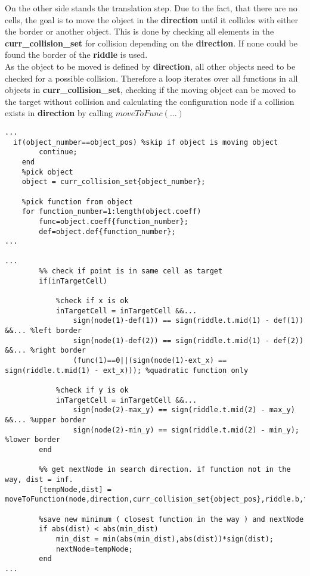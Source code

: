 On the other side stands the translation step. Due to the fact, that there are no cells, the goal is to move the object in the \textbf{direction} until it collides with either the border or another object. This is done by checking all elements in the \textbf{curr\_collision\_set} for collision depending on the \textbf{direction}. If none could be found the border of the \textbf{riddle} is used.\\
As the object to be moved is defined by \textbf{direction}, all other objects need to be checked for a possible collision. Therefore a loop iterates over all functions in all objects in \textbf{curr\_collision\_set}, checking if the moving object can be moved to the target without collision and calculating the configuration node if a collision exists in \textbf{direction} by calling $moveToFunc(...)$
 \begin{lstlisting}
...
  if(object_number==object_pos) %skip if object is moving object
        continue;
    end
    %pick object
    object = curr_collision_set{object_number};    

    %pick function from object
    for function_number=1:length(object.coeff)
        func=object.coeff{function_number};
        def=object.def{function_number};
...  

...
        %% check if point is in same cell as target
        if(inTargetCell)
            
            %check if x is ok
            inTargetCell = inTargetCell &&...
                sign(node(1)-def(1)) == sign(riddle.t.mid(1) - def(1)) &&... %left border
                sign(node(1)-def(2)) == sign(riddle.t.mid(1) - def(2)) &&... %right border
                (func(1)==0||(sign(node(1)-ext_x) == sign(riddle.t.mid(1) - ext_x))); %quadratic function only
            
            %check if y is ok
            inTargetCell = inTargetCell &&...
                sign(node(2)-max_y) == sign(riddle.t.mid(2) - max_y) &&... %upper border
                sign(node(2)-min_y) == sign(riddle.t.mid(2) - min_y); %lower border
        end
        
        %% get nextNode in search direction. if function not in the way, dist = inf.
        [tempNode,dist] = moveToFunction(node,direction,curr_collision_set{object_pos},riddle.b,func,def,object.above{function_number});
        
        %save new minimum ( closest function in the way ) and nextNode
        if abs(dist) < abs(min_dist)
            min_dist = min(abs(min_dist),abs(dist))*sign(dist);
            nextNode=tempNode;
        end
...
\end{lstlisting}
